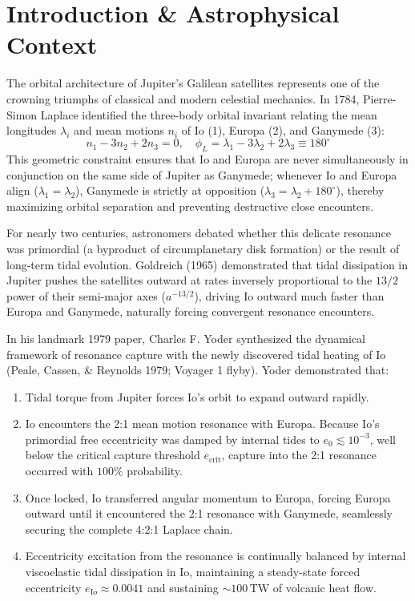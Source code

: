 \documentclass[11pt,a4paper]{article}
\begin{document}
\section{Introduction \& Astrophysical Context}
The orbital architecture of Jupiter's Galilean satellites represents one of the crowning triumphs of classical and modern celestial mechanics. In 1784, Pierre-Simon Laplace identified the three-body orbital invariant relating the mean longitudes $\lambda_i$ and mean motions $n_i$ of Io (1), Europa (2), and Ganymede (3):
\begin{equation}
n_1 - 3n_2 + 2n_3 = 0, \quad \phi_L = \lambda_1 - 3\lambda_2 + 2\lambda_3 \equiv 180^\circ
\end{equation}
This geometric constraint ensures that Io and Europa are never simultaneously in conjunction on the same side of Jupiter as Ganymede; whenever Io and Europa align ($\lambda_1 = \lambda_2$), Ganymede is strictly at opposition ($\lambda_3 = \lambda_2 + 180^\circ$), thereby maximizing orbital separation and preventing destructive close encounters.

For nearly two centuries, astronomers debated whether this delicate resonance was primordial (a byproduct of circumplanetary disk formation) or the result of long-term tidal evolution. Goldreich (1965) demonstrated that tidal dissipation in Jupiter pushes the satellites outward at rates inversely proportional to the $13/2$ power of their semi-major axes ($a^{-13/2}$), driving Io outward much faster than Europa and Ganymede, naturally forcing convergent resonance encounters.

In his landmark 1979 paper, Charles F. Yoder synthesized the dynamical framework of resonance capture with the newly discovered tidal heating of Io (Peale, Cassen, \& Reynolds 1979; Voyager 1 flyby). Yoder demonstrated that:
\begin{enumerate}
    \item Tidal torque from Jupiter forces Io's orbit to expand outward rapidly.
    \item Io encounters the 2:1 mean motion resonance with Europa. Because Io's primordial free eccentricity was damped by internal tides to $e_0 \lesssim 10^{-3}$, well below the critical capture threshold $e_{\mathrm{crit}}$, capture into the 2:1 resonance occurred with $100\%$ probability.
    \item Once locked, Io transferred angular momentum to Europa, forcing Europa outward until it encountered the 2:1 resonance with Ganymede, seamlessly securing the complete 4:2:1 Laplace chain.
    \item Eccentricity excitation from the resonance is continually balanced by internal viscoelastic tidal dissipation in Io, maintaining a steady-state forced eccentricity $e_{\mathrm{Io}} \approx 0.0041$ and sustaining $\sim 100\,\mathrm{TW}$ of volcanic heat flow.
\end{enumerate}
\end{document}
